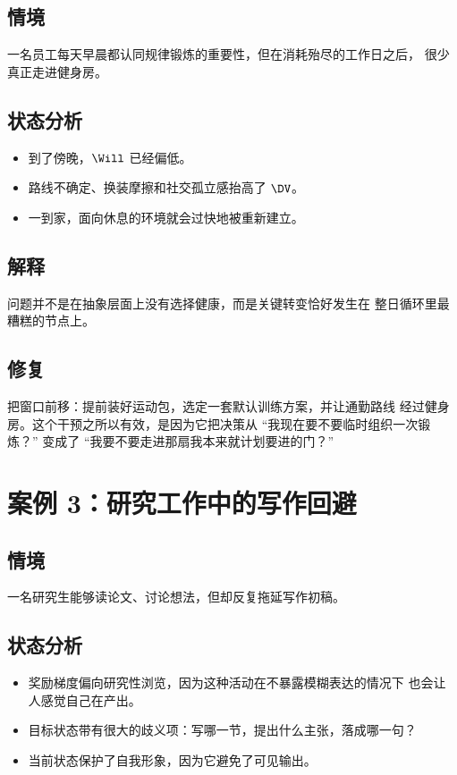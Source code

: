 \subsection*{情境}
一名员工每天早晨都认同规律锻炼的重要性，但在消耗殆尽的工作日之后，
很少真正走进健身房。

\subsection*{状态分析}
\begin{itemize}[nosep]
  \item 到了傍晚，$\Will$ 已经偏低。
  \item 路线不确定、换装摩擦和社交孤立感抬高了 $\DV$。
  \item 一到家，面向休息的环境就会过快地被重新建立。
\end{itemize}

\subsection*{解释}
问题并不是在抽象层面上没有选择健康，而是关键转变恰好发生在
整日循环里最糟糕的节点上。

\subsection*{修复}
把窗口前移：提前装好运动包，选定一套默认训练方案，并让通勤路线
经过健身房。这个干预之所以有效，是因为它把决策从
``我现在要不要临时组织一次锻炼？'' 变成了
``我要不要走进那扇我本来就计划要进的门？''

\section{案例 3：研究工作中的写作回避}

\subsection*{情境}
一名研究生能够读论文、讨论想法，但却反复拖延写作初稿。

\subsection*{状态分析}
\begin{itemize}[nosep]
  \item 奖励梯度偏向研究性浏览，因为这种活动在不暴露模糊表达的情况下
        也会让人感觉自己在产出。
  \item 目标状态带有很大的歧义项：写哪一节，提出什么主张，落成哪一句？
  \item 当前状态保护了自我形象，因为它避免了可见输出。
\end{itemize}

